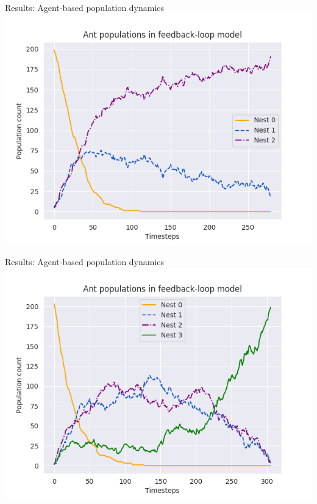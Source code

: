\documentclass{beamer}
\begin{document}

\begin{frame}{Results: Agent-based population dynamics}
    \includegraphics[scale=0.7]{agent_based_population_model}
\end{frame}

\begin{frame}{Results: Agent-based population dynamics}
    \includegraphics[scale=0.7]{agent_based_population_model2}
\end{frame}

\end{document}
